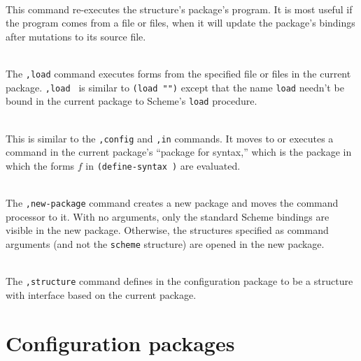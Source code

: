 \begin{description}
\item {} \\
    This command re-executes the structure's package's program.  It
    is most useful if the program comes from a file or files, when
    it will update the package's bindings after mutations to its
    source file.

\item {} \\
    The {\tt,load} command executes forms from the specified file or
    files in the current package.  {\tt,load } is similar
    to {\tt(load "")}
    except that the name {\tt load} needn't be bound in the current
    package to Scheme's {\tt load} procedure.

\item {} \\
    This is similar to the {\tt ,config} and {\tt ,in} commands.  It
    moves to or executes a command in the current package's ``package
    for syntax,'' which is the package in which the forms $f$ in
    {\tt (define-syntax  )} are evaluated.

  \item {} \\
    The {\tt,new-package} command creates a new package and moves the
    command processor to it.  With no arguments, only the standard
    Scheme bindings are visible in the new package.  Otherwise, the
    structures specified as command arguments (and not the
    \texttt{scheme} structure) are opened in the new package.

\item {} \\
    The {\tt ,structure} command defines  in the
    configuration package to be a structure with interface
     based on the current package.

\end{description}



\section{Configuration packages}
\label{config-packages}


